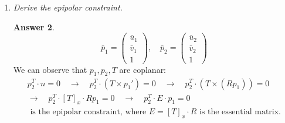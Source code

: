 \documentclass[a4paper,12 pt]{article}
\theoremstyle{definition}
\theoremstyle{remark}
\theoremstyle{definition}
\theoremstyle{definition}
\theoremstyle{definition}
\theoremstyle{definition}
\theoremstyle{remark}
\theoremstyle{remark}
\theoremstyle{definition}
\theoremstyle{definition}
\newtheorem*{answer}{Answer}
\begin{document}
\begin{enumerate}
\begin{answer}
\begin{itemize}
\item In \textit{stereo vision}, only \textbf{5 degrees of freedom} are measurable:
\begin{itemize}
\item 3 parameters to describe the \textbf{rotation}.
\item 2 parameters for the \textbf{translation up to a scale} (we can only compute the direction of translation but not its length (magnitude)).
\end{itemize}
\end{itemize}
How many knowns and unknowns?
\begin{itemize}
\item $4n$ knowns: $n$ correspondences, each one $(u_1^i,v_1^i)$ and $(u_2^i,v_2^i)$, $i=1,\hdots,n$.
\item $5+3n$ unknowns: 5 for the motion up to a scale (3 rotation and 2 translation) and $3n$ which is the number of coordinates of the $n$ 3D points.
\end{itemize}
It should hold
\begin{equation}
\begin{split}
4n &\geq 5+3n\\
\Rightarrow n&\geq 5.
\end{split}
\end{equation}
\end{answer}
\item \textit{Derive the epipolar constraint.}
\begin{answer}
\begin{equation}
\bar{p}_1=\begin{pmatrix}
\bar{u}_1\\
\bar{v}_1\\
1
\end{pmatrix},\quad \bar{p}_2=\begin{pmatrix}
\bar{u}_2\\
\bar{v}_2\\
1
\end{pmatrix}
\end{equation}
We can observe that $p_1,p_2,T$ are coplanar:
\begin{equation}
\begin{multlined}
p_2^T\cdot n=0 \quad
 \rightarrow  \quad p_2^T\cdot (T\times p_1')=0\quad
 \rightarrow  \quad  p_2^T \cdot (T\times (Rp_1)) =0 \\
 \rightarrow  \quad 
p_2^T\cdot [T]_x\cdot Rp_1 =0 \quad
 \rightarrow  \quad 
p_2^T \cdot E \cdot p_1=0\\
 \text{ is the epipolar constraint, where }E=[T]_x\cdot R \text{ is the essential matrix}. 

\end{multlined}
\end{equation}
\end{answer}
\end{enumerate}
\end{document}
